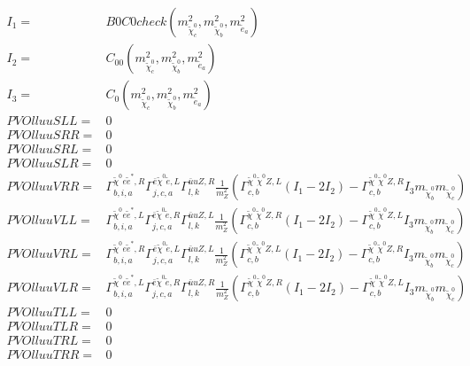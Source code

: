 \documentclass[A4,landscape]{article}
\begin{document}
\begin{align} 
I_1= & B0C0check(m^2_{\tilde{\chi}^0_{{c}}}, m^2_{\tilde{\chi}^0_{{b}}}, m^2_{\tilde{e}_{{a}}}) \\ 
I_2= & C_{00}(m^2_{\tilde{\chi}^0_{{c}}}, m^2_{\tilde{\chi}^0_{{b}}}, m^2_{\tilde{e}_{{a}}}) \\ 
I_3= & C_0(m^2_{\tilde{\chi}^0_{{c}}}, m^2_{\tilde{\chi}^0_{{b}}}, m^2_{\tilde{e}_{{a}}}) \\ 
  PVOlluuSLL= & 0 \\ 
  PVOlluuSRR= & 0 \\ 
  PVOlluuSRL= & 0 \\ 
  PVOlluuSLR= & 0 \\ 
  PVOlluuVRR= &  \Gamma^{\tilde{\chi}^0 e \tilde{e}^*,R}_{b, i, a} \Gamma^{\bar{e}\tilde{\chi}^0 \tilde{e} ,L}_{j, c, a} \Gamma^{\bar{u}u Z ,R}_{l, k} \frac{1}{m^2_{Z}} (\Gamma^{\tilde{\chi}^0 \tilde{\chi}^0 Z ,L}_{c, b} (I_1 - 2 I_2) - \Gamma^{\tilde{\chi}^0 \tilde{\chi}^0 Z ,R}_{c, b} I_3 m_{\tilde{\chi}^0_{{b}}} m_{\tilde{\chi}^0_{{c}}}) \\ 
  PVOlluuVLL= &  \Gamma^{\tilde{\chi}^0 e \tilde{e}^*,L}_{b, i, a} \Gamma^{\bar{e}\tilde{\chi}^0 \tilde{e} ,R}_{j, c, a} \Gamma^{\bar{u}u Z ,L}_{l, k} \frac{1}{m^2_{Z}} (\Gamma^{\tilde{\chi}^0 \tilde{\chi}^0 Z ,R}_{c, b} (I_1 - 2 I_2) - \Gamma^{\tilde{\chi}^0 \tilde{\chi}^0 Z ,L}_{c, b} I_3 m_{\tilde{\chi}^0_{{b}}} m_{\tilde{\chi}^0_{{c}}}) \\ 
  PVOlluuVRL= &  \Gamma^{\tilde{\chi}^0 e \tilde{e}^*,R}_{b, i, a} \Gamma^{\bar{e}\tilde{\chi}^0 \tilde{e} ,L}_{j, c, a} \Gamma^{\bar{u}u Z ,L}_{l, k} \frac{1}{m^2_{Z}} (\Gamma^{\tilde{\chi}^0 \tilde{\chi}^0 Z ,L}_{c, b} (I_1 - 2 I_2) - \Gamma^{\tilde{\chi}^0 \tilde{\chi}^0 Z ,R}_{c, b} I_3 m_{\tilde{\chi}^0_{{b}}} m_{\tilde{\chi}^0_{{c}}}) \\ 
  PVOlluuVLR= &  \Gamma^{\tilde{\chi}^0 e \tilde{e}^*,L}_{b, i, a} \Gamma^{\bar{e}\tilde{\chi}^0 \tilde{e} ,R}_{j, c, a} \Gamma^{\bar{u}u Z ,R}_{l, k} \frac{1}{m^2_{Z}} (\Gamma^{\tilde{\chi}^0 \tilde{\chi}^0 Z ,R}_{c, b} (I_1 - 2 I_2) - \Gamma^{\tilde{\chi}^0 \tilde{\chi}^0 Z ,L}_{c, b} I_3 m_{\tilde{\chi}^0_{{b}}} m_{\tilde{\chi}^0_{{c}}}) \\ 
  PVOlluuTLL= & 0 \\ 
  PVOlluuTLR= & 0 \\ 
  PVOlluuTRL= & 0 \\ 
  PVOlluuTRR= & 0 \\ 
\end{align} 
\end{document}
